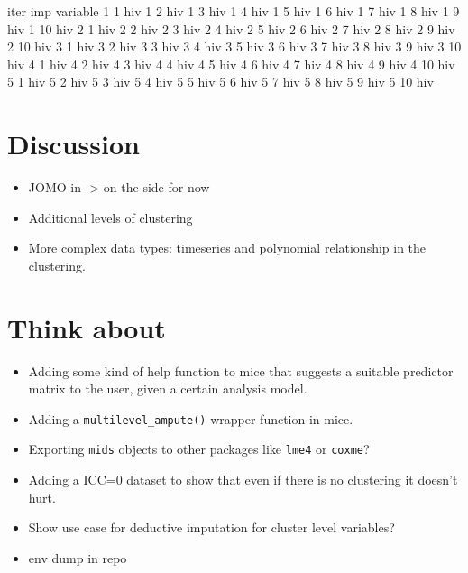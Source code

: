 \documentclass[
]{jss}
\begin{document}
\begin{CodeChunk}
\begin{CodeOutput}
 iter imp variable
  1   1  hiv
  1   2  hiv
  1   3  hiv
  1   4  hiv
  1   5  hiv
  1   6  hiv
  1   7  hiv
  1   8  hiv
  1   9  hiv
  1   10  hiv
  2   1  hiv
  2   2  hiv
  2   3  hiv
  2   4  hiv
  2   5  hiv
  2   6  hiv
  2   7  hiv
  2   8  hiv
  2   9  hiv
  2   10  hiv
  3   1  hiv
  3   2  hiv
  3   3  hiv
  3   4  hiv
  3   5  hiv
  3   6  hiv
  3   7  hiv
  3   8  hiv
  3   9  hiv
  3   10  hiv
  4   1  hiv
  4   2  hiv
  4   3  hiv
  4   4  hiv
  4   5  hiv
  4   6  hiv
  4   7  hiv
  4   8  hiv
  4   9  hiv
  4   10  hiv
  5   1  hiv
  5   2  hiv
  5   3  hiv
  5   4  hiv
  5   5  hiv
  5   6  hiv
  5   7  hiv
  5   8  hiv
  5   9  hiv
  5   10  hiv
\end{CodeOutput}
\end{CodeChunk}

\hypertarget{discussion}{%
\section{Discussion}\label{discussion}}

\begin{itemize}
\item
  JOMO in  -\textgreater{} on the side for now
\item
  Additional levels of clustering
\item
  More complex data types: timeseries and polynomial relationship in the
  clustering.
\end{itemize}

\hypertarget{think-about}{%
\section{Think about}\label{think-about}}

\begin{itemize}
\item
  Adding some kind of help function to mice that suggests a suitable
  predictor matrix to the user, given a certain analysis model.
\item
  Adding a \texttt{multilevel\_ampute()} wrapper function in mice.
\item
  Exporting \texttt{mids} objects to other packages like \texttt{lme4}
  or \texttt{coxme}?
\item
  Adding a ICC=0 dataset to show that even if there is no clustering it
  doesn't hurt.
\item
  Show use case for deductive imputation for cluster level variables?
\item
  env dump in repo
\end{itemize}

\renewcommand\refname{References}

\end{document}
